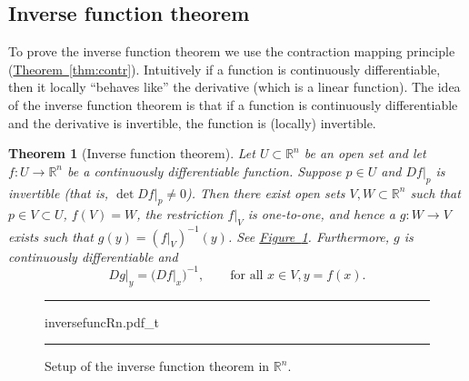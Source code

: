 \documentclass[12pt,openany]{book}
\newcommand{\R}{{\mathbb{R}}}
\theoremstyle{plain}
\newtheorem{thm}{Theorem}[section]
\theoremstyle{remark}
\theoremstyle{definition}
\newenvironment{myfig}{%
\begin{figure}[h!t]
\noindent\rule{\textwidth}{0.4pt}\vspace{12pt}\par\centering}%
{\par\noindent\rule{\textwidth}{0.4pt}
\end{figure}}
\theoremstyle{exercise}
\theoremstyle{example}
\newcommand{\figureref}[1]{\hyperref[#1]{Figure~\ref*{#1}}}
\newcommand{\thmref}[1]{\hyperref[#1]{Theorem~\ref*{#1}}}
\begin{document}
\subsection{Inverse function theorem}
\label{subsec:svinvfuncthm}

To prove the inverse function theorem we use the contraction mapping
principle (\thmref{thm:contr}).
Intuitively if a function is continuously differentiable, then it
locally ``behaves like'' the derivative (which is a linear function).
The idea of the inverse function theorem is that if a function is
continuously differentiable and the derivative is invertible, the function is
(locally) invertible.

\begin{thm}[Inverse function theorem]
\label{thm:inverse}
Let $U \subset \R^n$ be an open set and let
$f \colon U \to \R^n$ be a continuously differentiable function.
Suppose $p \in U$ and $Df|_p$ is invertible
(that is, $\det Df|_p \not=0$).
Then there exist open sets $V, W \subset \R^n$ such that
$p \in V \subset U$, $f(V) = W$, the restriction $f|_V$ is one-to-one,
and hence a $g \colon W \to V$ exists such that
$g(y) = (f|_V)^{-1}(y)$.
See \figureref{fig:inversefuncRn}.
Furthermore, $g$ is continuously differentiable
and 
\begin{equation*}
Dg|_y = {\bigl(Df|_x\bigr)}^{-1}, \qquad \text{for all } x \in V, y = f(x).
\end{equation*}
\end{thm}

\begin{myfig}
{inversefuncRn.pdf_t}
\caption{Setup of the inverse function theorem in $\R^n$.\label{fig:inversefuncRn}}
\end{myfig}
\end{document}
